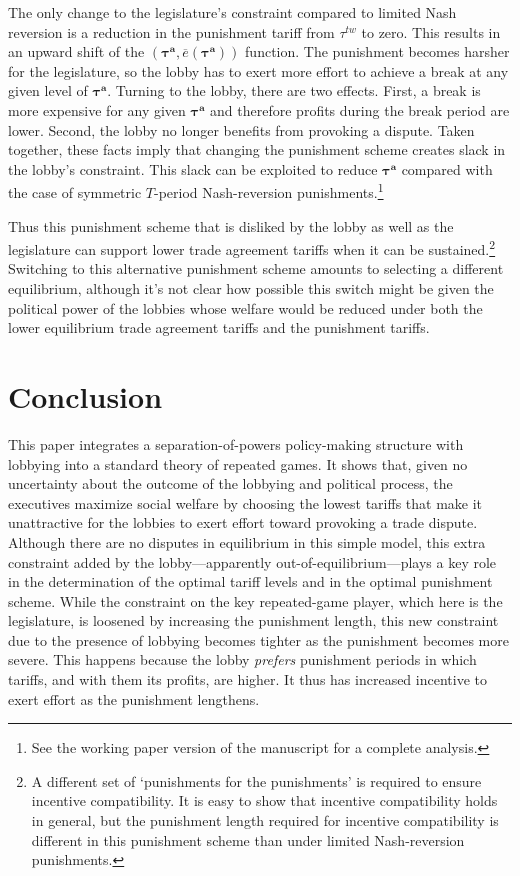 \documentclass[authoryear, review]{elsarticle}
\newcommand{\ov}{\overline}
\newcommand{\bta}{\bm{\tau^a}}
\begin{document}
The only change to the legislature's constraint compared to limited Nash reversion is a reduction in the punishment tariff from $\tau^{tw}$ to zero. This results in an upward shift of the $\left(\bta,\ov{e}\left(\bta\right) \right)$ function. The punishment becomes harsher for the legislature, so the lobby has to exert more effort to achieve a break at any given level of $\bta$. Turning to the lobby, there are two effects. First, a break is more expensive for any given $\bta$ and therefore profits during the break period are lower. Second, the lobby no longer benefits from provoking a dispute. Taken together, these facts imply that changing the punishment scheme creates slack in the lobby's constraint. This slack can be exploited to reduce $\bta$ compared with the case of symmetric $T$-period Nash-reversion punishments.\footnote{See the working paper version of the manuscript for a complete analysis.}

Thus this punishment scheme that is disliked by the lobby as well as the legislature can support lower trade agreement tariffs when it can be sustained.\footnote{A different set of `punishments for the punishments' is required to ensure incentive compatibility. It is easy to show that incentive compatibility holds in general, but the punishment length required for incentive compatibility is different in this punishment scheme than under limited Nash-reversion punishments.} Switching to this alternative punishment scheme amounts to selecting a different equilibrium, although it's not clear how possible this switch might be given the political power of the lobbies whose welfare would be reduced under both the lower equilibrium trade agreement tariffs and the punishment tariffs.


\section{Conclusion}
\label{sec:concl3}
This paper integrates a separation-of-powers policy-making structure with lobbying into a standard theory of repeated games. It shows that, given no uncertainty about the outcome of the lobbying and political process, the executives maximize social welfare by choosing the lowest tariffs that make it unattractive for the lobbies to exert effort toward provoking a trade dispute. Although there are no disputes in equilibrium in this simple model, this extra constraint added by the lobby---apparently out-of-equilibrium---plays a key role in the determination of the optimal tariff levels and in the optimal punishment scheme. While the constraint on the key repeated-game player, which here is the legislature, is loosened by increasing the punishment length, this new constraint due to the presence of lobbying becomes tighter as the punishment becomes more severe. This happens because the lobby \textit{prefers} punishment periods in which tariffs, and with them its profits, are higher. It thus has increased incentive to exert effort as the punishment lengthens.
\end{document}
